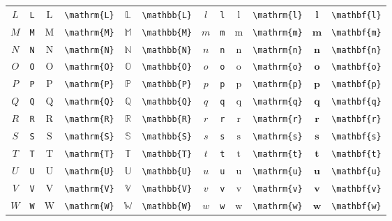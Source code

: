 \documentclass{ctexbook}
\begin{document}
\begin{table}[th]
\begin{tabular}{ c@{ }l c@{ }l c@{ }l c@{ }l c@{ }l c@{ }l}
		$L$ & \verb|L| & $\mathrm{L}$ & \verb|\mathrm{L}| & $\mathbb{L}$ & \verb|\mathbb{L}| & $l$ & \verb|l| & $\mathrm{l}$ & \verb|\mathrm{l}| & $\mathbf{l}$ & \verb|\mathbf{l}| \\
		$M$ & \verb|M| & $\mathrm{M}$ & \verb|\mathrm{M}| & $\mathbb{M}$ & \verb|\mathbb{M}| & $m$ & \verb|m| & $\mathrm{m}$ & \verb|\mathrm{m}| & $\mathbf{m}$ & \verb|\mathbf{m}| \\
		$N$ & \verb|N| & $\mathrm{N}$ & \verb|\mathrm{N}| & $\mathbb{N}$ & \verb|\mathbb{N}| & $n$ & \verb|n| & $\mathrm{n}$ & \verb|\mathrm{n}| & $\mathbf{n}$ & \verb|\mathbf{n}| \\
		$O$ & \verb|O| & $\mathrm{O}$ & \verb|\mathrm{O}| & $\mathbb{O}$ & \verb|\mathbb{O}| & $o$ & \verb|o| & $\mathrm{o}$ & \verb|\mathrm{o}| & $\mathbf{o}$ & \verb|\mathbf{o}| \\
		$P$ & \verb|P| & $\mathrm{P}$ & \verb|\mathrm{P}| & $\mathbb{P}$ & \verb|\mathbb{P}| & $p$ & \verb|p| & $\mathrm{p}$ & \verb|\mathrm{p}| & $\mathbf{p}$ & \verb|\mathbf{p}| \\
		$Q$ & \verb|Q| & $\mathrm{Q}$ & \verb|\mathrm{Q}| & $\mathbb{Q}$ & \verb|\mathbb{Q}| & $q$ & \verb|q| & $\mathrm{q}$ & \verb|\mathrm{q}| & $\mathbf{q}$ & \verb|\mathbf{q}| \\
		$R$ & \verb|R| & $\mathrm{R}$ & \verb|\mathrm{R}| & $\mathbb{R}$ & \verb|\mathbb{R}| & $r$ & \verb|r| & $\mathrm{r}$ & \verb|\mathrm{r}| & $\mathbf{r}$ & \verb|\mathbf{r}| \\
		$S$ & \verb|S| & $\mathrm{S}$ & \verb|\mathrm{S}| & $\mathbb{S}$ & \verb|\mathbb{S}| & $s$ & \verb|s| & $\mathrm{s}$ & \verb|\mathrm{s}| & $\mathbf{s}$ & \verb|\mathbf{s}| \\
		$T$ & \verb|T| & $\mathrm{T}$ & \verb|\mathrm{T}| & $\mathbb{T}$ & \verb|\mathbb{T}| & $t$ & \verb|t| & $\mathrm{t}$ & \verb|\mathrm{t}| & $\mathbf{t}$ & \verb|\mathbf{t}| \\
		$U$ & \verb|U| & $\mathrm{U}$ & \verb|\mathrm{U}| & $\mathbb{U}$ & \verb|\mathbb{U}| & $u$ & \verb|u| & $\mathrm{u}$ & \verb|\mathrm{u}| & $\mathbf{u}$ & \verb|\mathbf{u}| \\
		$V$ & \verb|V| & $\mathrm{V}$ & \verb|\mathrm{V}| & $\mathbb{V}$ & \verb|\mathbb{V}| & $v$ & \verb|v| & $\mathrm{v}$ & \verb|\mathrm{v}| & $\mathbf{v}$ & \verb|\mathbf{v}| \\
		$W$ & \verb|W| & $\mathrm{W}$ & \verb|\mathrm{W}| & $\mathbb{W}$ & \verb|\mathbb{W}| & $w$ & \verb|w| & $\mathrm{w}$ & \verb|\mathrm{w}| & $\mathbf{w}$ & \verb|\mathbf{w}| \\

\end{tabular}
\end{table}
\end{document}
